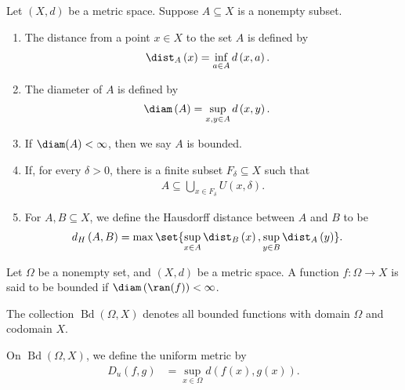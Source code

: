 \begin{definition}
  Let $\left(X,d\right)$ be a metric space. Suppose $A\subseteq X$ is a nonempty subset.
  \begin{enumerate}[(1)]
    \item The distance from a point $x\in X$ to the set $A$ is defined by
      \begin{align*}
        \dist_{A}\left(x\right) &= \inf_{a\in A}d\left(x,a\right).
      \end{align*}
    \item The diameter of $A$ is defined by
      \begin{align*}
        \diam\left(A\right) &= \sup_{x,y\in A}d\left(x,y\right).
      \end{align*}
    \item If $\diam(A) < \infty$, then we say $A$ is bounded.
    \item If, for every $\delta > 0$, there is a finite subset $F_{\delta}\subseteq X$ such that
      \begin{align*}
        A\subseteq \bigcup_{x\in F_{\delta}}U\left(x,\delta\right).
      \end{align*}
    \item For $A,B\subseteq X$, we define the Hausdorff distance between $A$ and $B$ to be
      \begin{align*}
        d_{H}\left(A,B\right) &= \max\set{\sup_{x\in A}\dist_{B}\left(x\right),\sup_{y\in B}\dist_{A}\left(y\right)}.
      \end{align*}
  \end{enumerate}
\end{definition}
\begin{example}
  Let $\Omega$ be a nonempty set, and $\left(X,d\right)$ be a metric space. A function $f: \Omega\rightarrow X$ is said to be bounded if $\diam\left(\ran(f)\right) < \infty$.\newline

  The collection $\operatorname{Bd}\left(\Omega,X\right)$ denotes all bounded functions with domain $\Omega$ and codomain $X$.\newline

  On $ \operatorname{Bd}\left(\Omega,X\right)$, we define the uniform metric by
  \begin{align*}
    D_{u}\left(f,g\right) &= \sup_{x\in\Omega}d\left(f(x),g(x)\right).
  \end{align*}
\end{example}
